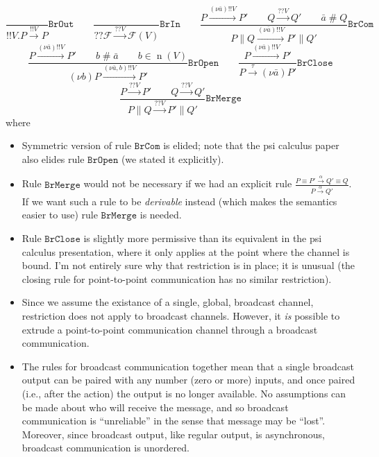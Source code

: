 \documentclass{article}
\newcommand{\bOut}{{!\!!}}
\newcommand{\bIn}{{?\!?}}
\newcommand{\new}[2]{(\nu\!#1) #2}
\newcommand{\freshFor}{\mathrel{\#}}
\DeclareMathOperator{\n}{n}
\begin{document}
\begin{itemize}
\begin{equation*}
%
%
\frac{
}{
\bOut V. P \xrightarrow{\bOut V} P
}
\mathtt{BrOut}
%
\qquad
%
%
\frac{
}{
\bIn \mathcal{F} \xrightarrow{\bIn V} \mathcal{F}(V)
}
\mathtt{BrIn}
%
\qquad
%
%
\frac{
P \xrightarrow{\new{\bar{a}}{\bOut V}} P' \qquad
Q \xrightarrow{\bIn V} Q' \qquad
\bar{a} \freshFor Q
}{
P \parallel Q \xrightarrow{\new{\bar{a}}{\bOut V}} P' \parallel Q'
}
\mathtt{BrCom}
\end{equation*}
%
\begin{equation*}
%
%
\frac{
P \xrightarrow{\new{\bar{a}}{\bOut V}} P' \qquad
b \freshFor \bar{a} \qquad
b \in \n(V)
}{
\new{b}{P} \xrightarrow{\new{\bar{a},b}{\bOut V}} P'
}
\mathtt{BrOpen}
%
\qquad
%
%
\frac{
P \xrightarrow{\new{\bar{a}}{\bOut V}} P'
}{
P \xrightarrow{\tau} \new{\bar{a}}{P'}
}
\mathtt{BrClose}
\end{equation*}
%
\begin{equation*}
%
%
\frac{
P \xrightarrow{\bIn V} P' \qquad
Q \xrightarrow{\bIn V} Q'
}{
P \parallel Q \xrightarrow{\bIn V} P' \parallel Q'
}
\mathtt{BrMerge}
\end{equation*}
%
where
%
\begin{itemize}
\item Symmetric version of rule $\mathtt{BrCom}$ is elided; note that the psi
calculus paper also elides rule $\mathtt{BrOpen}$ (we stated it explicitly).
\item Rule $\mathtt{BrMerge}$ would not be necessary if we had an explicit rule
\begin{math}
\displaystyle
\frac{
P \equiv P' \xrightarrow{\alpha} Q' \equiv Q
}{
P \xrightarrow{\alpha} Q'
}
\end{math}.
If we want such a rule to be \emph{derivable} instead (which makes the semantics
easier to use) rule $\mathtt{BrMerge}$ is needed.
\item Rule $\mathtt{BrClose}$ is slightly more permissive than its equivalent in
the psi calculus presentation, where it only applies at the point where the
channel is bound. I'm not entirely sure why that restriction is in place; it
is unusual (the closing rule for point-to-point communication has no similar
restriction).
\item Since we assume the existance of a single, global, broadcast channel,
restriction does not apply to broadcast channels. However, it \emph{is} possible
to extrude a point-to-point communication channel through a broadcast communication.
\item The rules for broadcast communication together mean that a single
broadcast output can be paired with any number (zero or more) inputs, and once
paired  (i.e., after the action) the output is no longer available. No
assumptions can be made about who will receive the message, and so broadcast
communication is ``unreliable'' in the sense that message may be ``lost''.
Moreover, since broadcast output, like regular output, is asynchronous,
broadcast communication is unordered.
\end{itemize}


\end{itemize}
\end{document}
